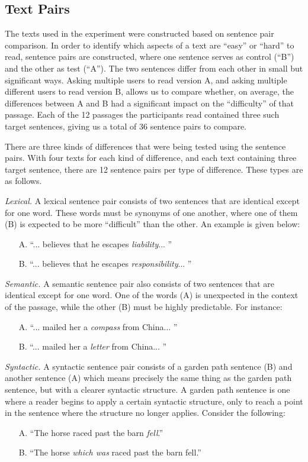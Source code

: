 \documentclass[11pt,letterpaper]{article}
\begin{document}
	\subsection{Text Pairs}
	
	The texts used in the experiment were constructed based on sentence pair comparison. In order to identify which aspects of a text are ``easy'' or ``hard'' to read, sentence pairs are constructed, where one sentence serves as control (``B'') and the other as test (``A''). The two sentences differ from each other in small but significant ways. Asking multiple users to read version A, and asking multiple different users to read version B, allows us to compare whether, on average, the differences between A and B had a significant impact on the ``difficulty'' of that passage. Each of the 12 passages the participants read contained three such target sentences, giving us a total of 36 sentence pairs to compare.
	
	There are three kinds of differences that were being tested using the sentence pairs. With four texts for each kind of difference, and each text containing three target sentence, there are 12 sentence pairs per type of difference. These types are as follows.
	
	\textit{Lexical.} A lexical sentence pair consists of two sentences that are identical except for one word. These words must be synonyms of one another, where one of them (B) is expected to be more ``difficult'' than the other. An example is given below:
	\begin{itemize}[noitemsep, nolistsep]
		\item[A.] ``... believes that he escapes \textit{liability}... ''
		\item[B.] ``... believes that he escapes \textit{responsibility}... ''
	\end{itemize}
	
	\textit{Semantic.} A semantic sentence pair also consists of two sentences that are identical except for one word. One of the words (A) is unexpected in the context of the passage, while the other (B) must be highly predictable. For instance:
	\begin{itemize}[noitemsep, nolistsep]
		\item[A.] ``... mailed her a \textit{compass} from China... ''
		\item[B.] ``... mailed her a \textit{letter} from China... ''
	\end{itemize}
	
	\textit{Syntactic.} A syntactic sentence pair consists of a garden path sentence (B) and another sentence (A) which means precisely the same thing as the garden path sentence, but with a clearer syntactic structure. A garden path sentence is one where a reader begins to apply a certain syntactic structure, only to reach a point in the sentence where the structure no longer applies. Consider the following:
	\begin{itemize}[noitemsep, nolistsep]
		\item[A.] ``The horse raced past the barn \textit{fell}.''
		\item[B.] ``The horse \textit{which was} raced past the barn fell.''
	\end{itemize}
	
\end{document}
